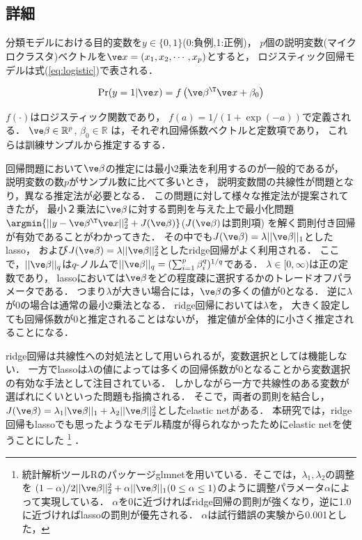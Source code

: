 \subsection{詳細}

分類モデルにおける目的変数を$y\in \{0,1\}$(0:負例,1:正例)，
$p$個の説明変数(マイクロクラスタ)ベクトルを$\ve x=(x_1,x_2,\cdots,x_p)$とすると，
ロジスティック回帰モデルは式(\ref{eq:logistic})で表される．

\begin{align}
\label{eq:logistic}
\Pr(y=1 | \ve x) =
f \left(\ve \beta^{\T}\ve x + \beta_0\right)
\end{align}

$f(\cdot)$はロジスティック関数であり，
$f (a) =1/(1+\exp\left(-a\right))$で定義される．
%
$\ve \beta \in \mathbb R^{p}$, $\beta_0 \in \mathbb R$
は，それぞれ回帰係数ベクトルと定数項であり，
これらは訓練サンプルから推定するする．

回帰問題において$\ve \beta$の推定には最小2乗法を利用するのが一般的であるが，
説明変数の数$p$がサンプル数に比べて多いとき，
説明変数間の共線性が問題となり，異なる推定法が必要となる．
この問題に対して様々な推定法が提案されてきたが，
最小２乗法に$\ve \beta$に対する罰則を与えた上で最小化問題$\argmin\{||y-\ve \beta^{\T}\ve x||^2_2+J(\ve \beta)\}$($J(\ve \beta)$は罰則項)
を解く罰則付き回帰が有効であることがわかってきた．
その中でも$J(\ve \beta)=\lambda ||\ve \beta||_1$としたlasso，
および$J(\ve \beta)=\lambda ||\ve \beta||_2^2$としたridge回帰がよく利用される．
ここで，$||\ve \beta||_q$は$q$-ノルムで$||\ve \beta||_q=(\sum_{i=1}^{p} \beta_{i}^q)^{1/q}$である．
$\lambda \in [0,\infty)$は正の定数であり，
lassoにおいては$\ve \beta$をどの程度疎に選択するかのトレードオフパラメータである．
つまり$\lambda$が大きい場合には，$\ve \beta$の多くの値が$0$となる．
逆に$\lambda$が0の場合は通常の最小2乗法となる．
ridge回帰においては$\lambda$を，
大きく設定しても回帰係数が0と推定されることはないが，
推定値が全体的に小さく推定されることになる．

ridge回帰は共線性への対処法として用いられるが，変数選択としては機能しない．
一方でlassoは$\lambda$の値によっては多くの回帰係数が0となることから変数選択の有効な手法として注目されている．
しかしながら一方で共線性のある変数が選ばれにくいといった問題も指摘される．
そこで，両者の罰則を結合し，$J(\ve \beta)=\lambda_1 |\ve \beta||_1 + \lambda_2||\ve \beta||_2^2$としたelastic netがある\cite{Zou05}．
本研究では，ridge回帰もlassoでも思ったようなモデル精度が得られなかったためにelastic netを使うことにした
\footnote{統計解析ツールRのパッケージglmnetを用いている．そこでは，$\lambda_1,\lambda_2$の調整を
$(1-\alpha)/2||\ve \beta||_2^2+\alpha||\ve \beta||_1 (0\le \alpha \le 1)$のように調整パラメータ$\alpha$によって実現している．
$\alpha$を0に近づければridge回帰の罰則が強くなり，逆に1.0に近づければlassoの罰則が優先される．
$\alpha$は試行錯誤の実験から0.001とした，}
．

